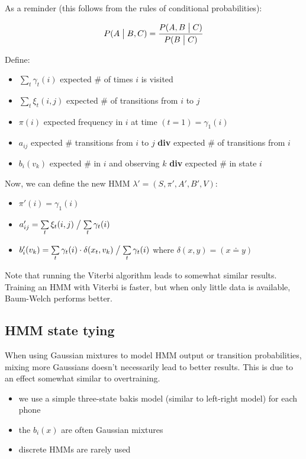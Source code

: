 As a reminder (this follows from the rules of conditional probabilities):

\begin{equation}
    P(A \bigm| B, C) = \frac{P(A, B \bigm| C)}{P(B \bigm| C)}
\end{equation}

Define:
\begin{itemize}
    \item $\sum\limits_t \gamma_t(i)$ expected \# of times $i$ is visited
    \item $\sum\limits_t \xi_t(i, j)$ expected \# of transitions from $i$ to $j$
    \item $\pi(i)$ expected frequency in $i$ at time $(t = 1) = \gamma_1(i)$
    \item $a_{ij}$ expected \# transitions from $i$ to $j$ \textbf{div} expected \# of transitions from $i$
    \item $b_i(v_k)$ expected \# in $i$ and observing $k$ \textbf{div} expected \# in state $i$
\end{itemize}

Now, we can define the new HMM $\lambda' = (S, \pi', A', B', V)$:
\begin{itemize}
    \item $\pi'(i) = \gamma_1(i)$
    \item $a'_{ij} = \sum\limits_t \xi_t(i, j) \bigm/ \sum\limits_t \gamma_t(i)$
    \item $b'_i(v_k) = \sum\limits_t \gamma_t(i) \cdot \delta(x_t, v_k) \bigm/ \sum\limits_t \gamma_t(i)$ where $\delta(x, y) = (x \doteq y)$
\end{itemize}

Note that running the Viterbi algorithm leads to somewhat similar results. Training an HMM with Viterbi is faster, but when only little data is available, Baum-Welch performs better.

\subsection{HMM state tying}

When using Gaussian mixtures to model HMM output or transition probabilities, mixing more Gaussians doesn't necessarily lead to better results. This is due to an effect somewhat similar to overtraining.

\begin{itemize}
    \item we use a simple three-state bakis model (similar to left-right model) for each phone
    \item the $b_i(x)$ are often Gaussian mixtures
    \item discrete HMMs are rarely used
\end{itemize}


